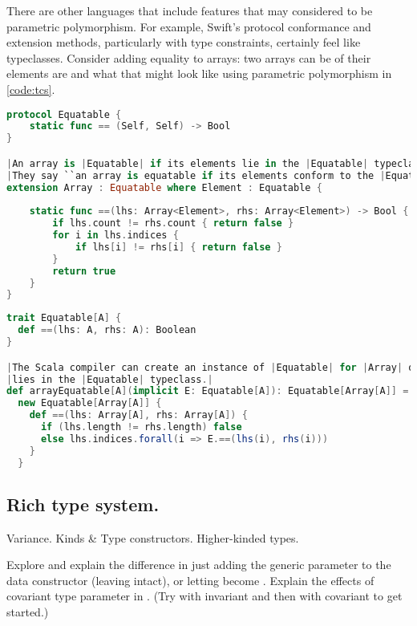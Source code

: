 \documentclass[10 pt]{article}
\begin{document}
There are other languages that include features that may considered to be parametric polymorphism. For example, Swift's protocol conformance and extension methods, particularly with type constraints, certainly feel like typeclasses. Consider adding equality to arrays: two arrays can be  of their elements are  and what that might look like using parametric polymorphism in \autoref{code:tcs}.

\begin{lstlisting}[language=Swift, escapechar=|]
protocol Equatable {
    static func == (Self, Self) -> Bool
}

|An array is |Equatable| if its elements lie in the |Equatable| typeclass. No, wait, that's not what Swift programmers say.|
|They say ``an array is equatable if its elements conform to the |Equatable| protocol''.|
extension Array : Equatable where Element : Equatable {
    
    static func ==(lhs: Array<Element>, rhs: Array<Element>) -> Bool {
        if lhs.count != rhs.count { return false }
        for i in lhs.indices {
            if lhs[i] != rhs[i] { return false }
        }
        return true
    }
}
\end{lstlisting}
\begin{lstlisting}[caption={Extension methods and protocol conformance}, label={code:tcs}, language=Scala, escapechar=|]
trait Equatable[A] {
  def ==(lhs: A, rhs: A): Boolean
}

|The Scala compiler can create an instance of |Equatable| for |Array| of elements of type |A| as long as the type |A
|lies in the |Equatable| typeclass.|
def arrayEquatable[A](implicit E: Equatable[A]): Equatable[Array[A]] = 
  new Equatable[Array[A]] {
    def ==(lhs: Array[A], rhs: Array[A]) {
      if (lhs.length != rhs.length) false 
      else lhs.indices.forall(i => E.==(lhs(i), rhs(i)))
    }
  }
\end{lstlisting}

\subsection{Rich type system.}
Variance. Kinds \& Type constructors. Higher-kinded types.

\begin{example}
Explore and explain the difference in just adding the generic parameter to the  data constructor (leaving  intact), or letting  become . Explain the effects of covariant type parameter in . (Try  with invariant  and then with covariant  to get started.)

\begin{lstlisting}[caption={Variance}, label={code:variance}, language=Scala, escapechar=|]


\end{lstlisting}
\end{example}
\end{document}
